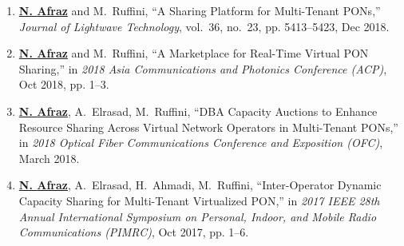  \begin{enumerate}
   
    \item \textbf{\underline{N. {Afraz}}} and M.~{Ruffini}, ``A Sharing Platform for Multi-Tenant PONs,'' \emph{Journal of Lightwave Technology}, vol.~36, no.~23, pp. 5413--5423, Dec 2018.

    \item \textbf{\underline{N. {Afraz}}} and M.~{Ruffini}, ``A Marketplace for Real-Time Virtual PON Sharing,'' in \emph{2018 Asia Communications and Photonics Conference (ACP)}, Oct 2018, pp. 1--3.

    \item \textbf{\underline{N. {Afraz}}}, A.~{Elrasad}, M.~{Ruffini}, ``DBA Capacity Auctions to Enhance Resource Sharing Across Virtual Network Operators in Multi-Tenant PONs,'' in \emph{2018 Optical Fiber Communications Conference and Exposition (OFC)}, March 2018.
   
    \item \textbf{\underline{N. {Afraz}}}, A.~{Elrasad}, H.~Ahmadi,  M.~{Ruffini}, ``Inter-Operator Dynamic Capacity Sharing for Multi-Tenant Virtualized PON,'' in \emph{2017 IEEE 28th Annual International Symposium on Personal, Indoor, and Mobile Radio Communications (PIMRC)}, Oct 2017, pp. 1--6.

 \end{enumerate}
